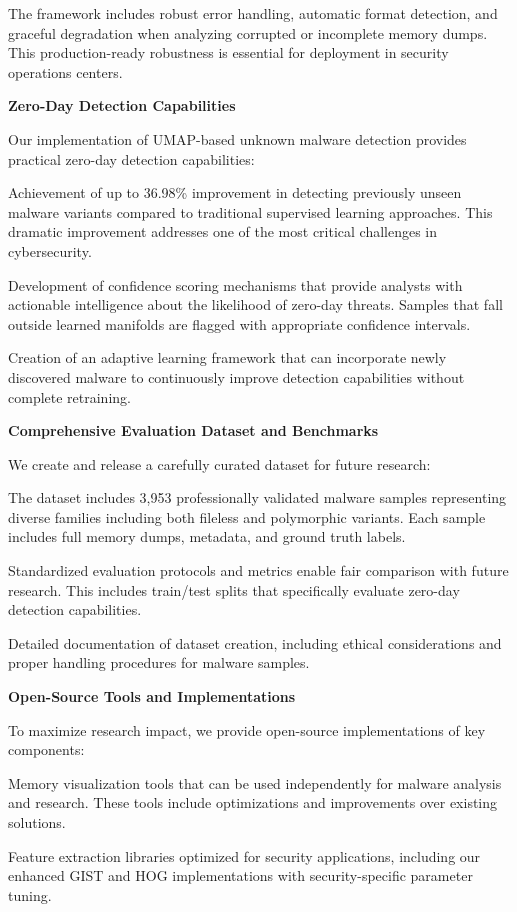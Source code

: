 The framework includes robust error handling, automatic format detection, and graceful degradation when analyzing corrupted or incomplete memory dumps. This production-ready robustness is essential for deployment in security operations centers.

\textbf{Zero-Day Detection Capabilities}

Our implementation of UMAP-based unknown malware detection provides practical zero-day detection capabilities:

Achievement of up to 36.98\% improvement in detecting previously unseen malware variants compared to traditional supervised learning approaches. This dramatic improvement addresses one of the most critical challenges in cybersecurity.

Development of confidence scoring mechanisms that provide analysts with actionable intelligence about the likelihood of zero-day threats. Samples that fall outside learned manifolds are flagged with appropriate confidence intervals.

Creation of an adaptive learning framework that can incorporate newly discovered malware to continuously improve detection capabilities without complete retraining.

\textbf{Comprehensive Evaluation Dataset and Benchmarks}

We create and release a carefully curated dataset for future research:

The dataset includes 3,953 professionally validated malware samples representing diverse families including both fileless and polymorphic variants. Each sample includes full memory dumps, metadata, and ground truth labels.

Standardized evaluation protocols and metrics enable fair comparison with future research. This includes train/test splits that specifically evaluate zero-day detection capabilities.

Detailed documentation of dataset creation, including ethical considerations and proper handling procedures for malware samples.

\textbf{Open-Source Tools and Implementations}

To maximize research impact, we provide open-source implementations of key components:

Memory visualization tools that can be used independently for malware analysis and research. These tools include optimizations and improvements over existing solutions.

Feature extraction libraries optimized for security applications, including our enhanced GIST and HOG implementations with security-specific parameter tuning.

